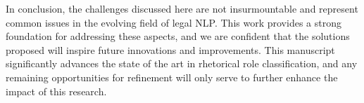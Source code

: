 In conclusion, the challenges discussed here are not insurmountable and represent common issues in the evolving field of legal NLP. This work provides a strong foundation for addressing these aspects, and we are confident that the solutions proposed will inspire future innovations and improvements. This manuscript significantly advances the state of the art in rhetorical role classification, and any remaining opportunities for refinement will only serve to further enhance the impact of this research.